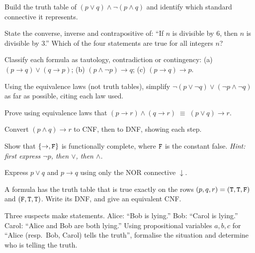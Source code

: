 \begin{exercise}{\easy}
Build the truth table of $(p \vee q) \wedge \neg(p \wedge q)$ and identify
which standard connective it represents.
\end{exercise}

\begin{exercise}{\medium}
State the converse, inverse and contrapositive of: ``If $n$ is divisible by
$6$, then $n$ is divisible by $3$.'' Which of the four statements are true for
all integers $n$?
\end{exercise}

\begin{exercise}{\medium}
Classify each formula as tautology, contradiction or contingency:
(a) $(p \to q) \vee (q \to p)$;\quad
(b) $(p \wedge \neg p) \to q$;\quad
(c) $(p \to q) \to p$.
\end{exercise}

\begin{exercise}{\medium}
Using the equivalence laws (not truth tables), simplify
$\neg(p \vee \neg q) \vee (\neg p \wedge \neg q)$ as far as possible, citing
each law used.
\end{exercise}

\begin{exercise}{\medium}
Prove using equivalence laws that
$(p \to r) \wedge (q \to r) \;\equiv\; (p \vee q) \to r$.
\end{exercise}

\begin{exercise}{\medium}
Convert $(p \wedge q) \to r$ to CNF, then to DNF, showing each step.
\end{exercise}

\begin{exercise}{\hard}
Show that $\{\to, \mathtt{F}\}$ is functionally complete, where $\mathtt{F}$ is the constant
false. \emph{Hint: first express $\neg p$, then $\vee$, then $\wedge$.}
\end{exercise}

\begin{exercise}{\hard}
Express $p \vee q$ and $p \to q$ using only the NOR connective $\downarrow$.
\end{exercise}

\begin{exercise}{\hard}
A formula has the truth table that is true exactly on the rows
$(p,q,r) = (\mathtt{T},\mathtt{T},\mathtt{F})$ and $(\mathtt{F},\mathtt{T},\mathtt{T})$. Write its DNF, and give an
equivalent CNF.
\end{exercise}

\begin{exercise}{\hard}
Three suspects make statements. Alice: ``Bob is lying.'' Bob: ``Carol is
lying.'' Carol: ``Alice and Bob are both lying.'' Using propositional
variables $a, b, c$ for ``Alice (resp.\ Bob, Carol) tells the truth'',
formalise the situation and determine who is telling the truth.
\end{exercise}


